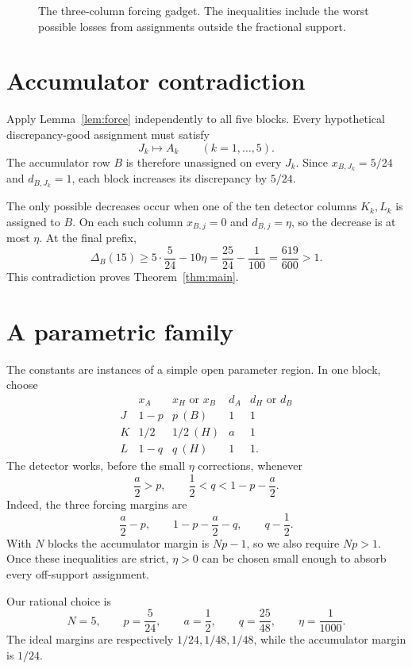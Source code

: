 \documentclass[11pt]{article}
\theoremstyle{definition}
\newcommand{\disc}{\Delta}
\begin{document}
\begin{figure}[ht]
\centering
\resizebox{\textwidth}{!}{}
\caption{The three-column forcing gadget.  The inequalities include the
worst possible losses from assignments outside the fractional support.}
\label{fig:gadget}
\end{figure}

\section{Accumulator contradiction}\label{sec:accumulator}

Apply Lemma~\ref{lem:force} independently to all five blocks.  Every
hypothetical discrepancy-good assignment must satisfy
\[
 J_k\longmapsto A_k\qquad(k=1,\ldots,5).
\]
The accumulator row $B$ is therefore unassigned on every $J_k$.  Since
$x_{B,J_k}=5/24$ and $d_{B,J_k}=1$, each block increases its discrepancy by
$5/24$.

The only possible decreases occur when one of the ten detector columns
$K_k,L_k$ is assigned to $B$.  On each such column $x_{B,j}=0$ and
$d_{B,j}=\eta$, so the decrease is at most $\eta$.  At the final prefix,
\[
 \disc_B(15)
 \ge 5\cdot\frac5{24}-10\eta
 =\frac{25}{24}-\frac1{100}
 =\frac{619}{600}>1.
\]
This contradiction proves Theorem~\ref{thm:main}.

\section{A parametric family}

The constants are instances of a simple open parameter region.  In one
block, choose
\[
\begin{array}{c|cc|cc}
 & x_A & x_H\text{ or }x_B & d_A & d_H\text{ or }d_B\\
\hline
J & 1-p & p\ (B) & 1 & 1\\
K & 1/2 & 1/2\ (H) & a & 1\\
L & 1-q & q\ (H) & 1 & 1.
\end{array}
\]
The detector works, before the small $\eta$ corrections, whenever
\[
 \frac a2>p,
 \qquad
 \frac12<q<1-p-\frac a2.
\]
Indeed, the three forcing margins are
\[
 \frac a2-p,
 \qquad
 1-p-\frac a2-q,
 \qquad
 q-\frac12.
\]
With $N$ blocks the accumulator margin is $Np-1$, so we also require
$Np>1$.  Once these inequalities are strict, $\eta>0$ can be chosen small
enough to absorb every off-support assignment.

Our rational choice is
\[
 N=5,\qquad p=\frac5{24},\qquad a=\frac12,
 \qquad q=\frac{25}{48},\qquad \eta=\frac1{1000}.
\]
The ideal margins are respectively $1/24,1/48,1/48$, while the accumulator
margin is $1/24$.
\end{document}
